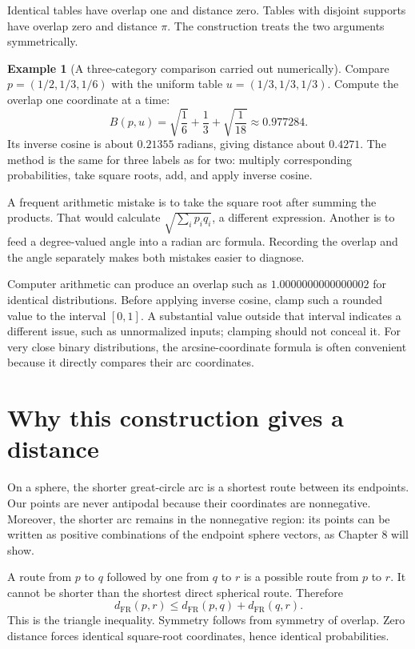 \documentclass[11pt,oneside,openany]{book}
\theoremstyle{definition}
\newtheorem{example}{Example}[chapter]
\theoremstyle{remark}
\numberwithin{equation}{chapter}
\begin{document}
Identical tables have overlap one and distance zero. Tables with disjoint supports have overlap zero and distance \(\pi\). The construction treats the two arguments symmetrically.

\begin{example}[A three-category comparison carried out numerically]

Compare \(p=(1/2,1/3,1/6)\) with the uniform table \(u=(1/3,1/3,1/3)\). Compute the overlap one coordinate at a time: \[B(p,u)=\sqrt{\frac16}+\frac13+\sqrt{\frac1{18}}
\approx0.977284.\] Its inverse cosine is about \(0.21355\) radians, giving distance about \(0.4271\). The method is the same for three labels as for two: multiply corresponding probabilities, take square roots, add, and apply inverse cosine.

\end{example}

A frequent arithmetic mistake is to take the square root after summing the products. That would calculate \(\sqrt{\sum_i p_iq_i}\), a different expression. Another is to feed a degree-valued angle into a radian arc formula. Recording the overlap and the angle separately makes both mistakes easier to diagnose.

Computer arithmetic can produce an overlap such as \(1.0000000000000002\) for identical distributions. Before applying inverse cosine, clamp such a rounded value to the interval \([0,1]\). A substantial value outside that interval indicates a different issue, such as unnormalized inputs; clamping should not conceal it. For very close binary distributions, the arcsine-coordinate formula is often convenient because it directly compares their arc coordinates.

\section{Why this construction gives a distance}\label{ch07-why-this-construction-gives-a-distance}

On a sphere, the shorter great-circle arc is a shortest route between its endpoints. Our points are never antipodal because their coordinates are nonnegative. Moreover, the shorter arc remains in the nonnegative region: its points can be written as positive combinations of the endpoint sphere vectors, as Chapter 8 will show.

A route from \(p\) to \(q\) followed by one from \(q\) to \(r\) is a possible route from \(p\) to \(r\). It cannot be shorter than the shortest direct spherical route. Therefore \[d_{\mathrm{FR}}(p,r)\leq d_{\mathrm{FR}}(p,q)+d_{\mathrm{FR}}(q,r).\] This is the triangle inequality. Symmetry follows from symmetry of overlap. Zero distance forces identical square-root coordinates, hence identical probabilities.
\end{document}
